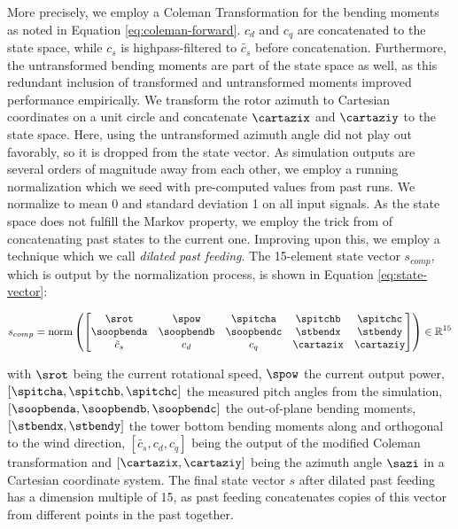 More precisely, we employ a Coleman Transformation for the bending moments as noted in Equation \ref{eq:coleman-forward}. $c_d$ and $c_q$ are concatenated to the state space, while $c_s$ is highpass-filtered to $\tilde{c_s}$ before concatenation. Furthermore, the untransformed bending moments are part of the state space as well, as this redundant inclusion of transformed and untransformed moments improved performance empirically. We transform the rotor azimuth to Cartesian coordinates on a unit circle and concatenate $\cartazix$ and $\cartaziy$ to the state space. Here, using the untransformed azimuth angle did not play out favorably, so it is dropped from the state vector. As simulation outputs are several orders of magnitude away from each other, we employ a running normalization which we seed with pre-computed values from past runs. We normalize to mean 0 and standard deviation 1 on all input signals. As the state space does not fulfill the Markov property, we employ the trick from \citet{mnihPlayingAtariDeep2013} of concatenating past states to the current one. Improving upon this, we employ a technique which we call \textit{dilated past feeding}. The 15-element state vector $s_{comp}$, which is output by the normalization process, is shown in Equation \ref{eq:state-vector}:

\begin{equation}
  s_{comp} = \text{norm} \left(
  \begin{bmatrix}
    \srot &
    \spow &
    \spitcha &
    \spitchb &
    \spitchc \\
    \soopbenda &
    \soopbendb &
    \soopbendc &
    \stbendx &
    \stbendy \\
    \tilde c_s &
    c_d &
    c_q &
    \cartazix &
    \cartaziy
  \end{bmatrix} 
  \right) \in \mathbb{R}^{15}
  \label{eq:state-vector}
\end{equation}

with $\srot$ being the current rotational speed, $\spow$ the current output power, $[\spitcha, \spitchb, \spitchc]$ the measured pitch angles from the simulation, $[\soopbenda, \soopbendb, \soopbendc]$ the out-of-plane bending moments, $[\stbendx, \stbendy]$ the tower bottom bending moments along and orthogonal to the wind direction, $[\tilde{c_s}, c_d, c_q]$ being the output of the modified Coleman transformation and $[\cartazix, \cartaziy]$ being the azimuth angle $\sazi$ in a Cartesian coordinate system. The final state vector $s$ after dilated past feeding has a dimension multiple of 15, as past feeding concatenates copies of this vector from different points in the past together.

